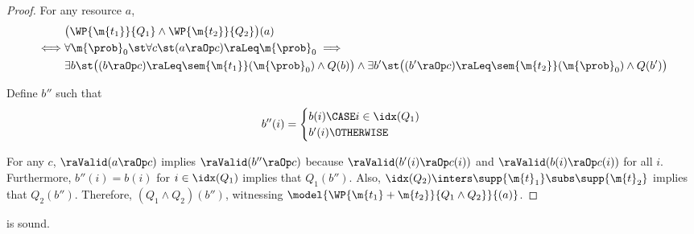 \documentclass[acmsmall,nonacm,screen,appendix]{acmart}
\begin{document}
\begin{proof}
     For any resource $a$,
      \begin{align*}
        & \bigl(\WP {\m{t_1}} {Q_1} \land   \WP {\m{t_2}} {Q_2}\bigr)(a)
        \\
        \iff &
        \forall \m{\prob}_0 \st
        \forall c \st
        (a \raOp c) \raLeq \m{\prob}_0
        \implies \\
             & \exists b \st
        \bigl(
          (b \raOp c) \raLeq \sem{\m{t_1}}(\m{\prob}_0)
          \land
          Q(b)
       \bigr) \land
         \exists b' \st
        \bigl(
          (b' \raOp c) \raLeq \sem{\m{t_2}}(\m{\prob}_0)
          \land
          Q(b')
       \bigr)
      \end{align*}

      Define $b''$ such that
      \begin{align*}
        b''(i) & =
        \begin{cases}
          b(i) \CASE i \in \idx(Q_1) \\
          b'(i) \OTHERWISE
        \end{cases}
      \end{align*}

      For any $c$, $\raValid(a \raOp c)$ implies
       $\raValid(b'' \raOp c)$ because
       $\raValid(b'(i) \raOp c(i))$ and
       $\raValid(b(i) \raOp c(i))$ for all $i$.
       Furthermore,
       $b''(i) = b(i)$ for $i \in \idx(Q_1)$ implies
       that $Q_1(b'')$.
       Also,
       $\idx(Q_2) \inters \supp{\m{t}_1} \subs \supp{\m{t}_2}$
       implies
       that $Q_2(b'')$.
       Therefore, $(Q_1 \land Q_2)(b'')$, witnessing
       $\model{\WP {\m{t_1} + \m{t_2}} {Q_1 \land Q_2}}{(a)} $.
\end{proof} \begin{lemma}
\label{proof:c-wp-swap}
   is sound.
\end{lemma}
\end{document}
